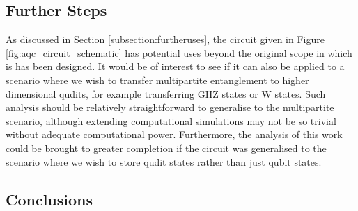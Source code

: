 \subsection{Further Steps}
\label{subsection:furthersteps}
As discussed in Section \ref{subsection:furtheruses}, the circuit given in Figure \ref{fig:aqc_circuit_schematic} has potential uses beyond the original scope in which is has been designed.
It would be of interest to see if it can also be applied to a scenario where we wish to transfer multipartite entanglement to higher dimensional qudits, for example transferring GHZ states or W states.
Such analysis should be relatively straightforward to generalise to the multipartite scenario, although extending computational simulations may not be so trivial without adequate computational power.
Furthermore, the analysis of this work could be brought to greater completion if the circuit was generalised to the scenario where we wish to store qudit states rather than just qubit states.

\subsection{Conclusions}
\label{subsection:conclusions}